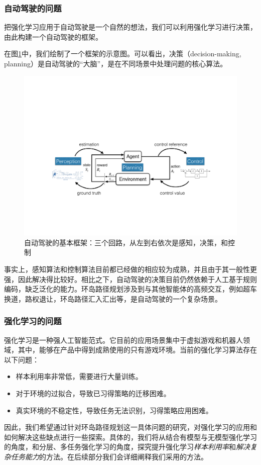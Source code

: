 \documentclass[degree=bachelor, tocarialchapter, pifootnote]{thuthesis}
\begin{document}
    \subsubsection{自动驾驶的问题}
      把强化学习应用于自动驾驶是一个自然的想法，我们可以利用强化学习进行决策，由此构建一个自动驾驶的框架\cite{DRL_for_driving}。\par
      在图\ref{fig:self-driving_overview}中，我们绘制了一个框架的示意图。可以看出，决策（decision-making, planning）是自动驾驶的``大脑''，是在不同场景中处理问题的核心算法。\par
      \begin{figure}[H] %
        \centering
        \includegraphics[scale=0.5]{driving_overview}
        \caption{自动驾驶的基本框架：三个回路，从左到右依次是感知，决策，和控制}
        \label{fig:self-driving_overview}
      \end{figure}
      事实上，感知算法和控制算法目前都已经做的相应较为成熟，并且由于其一般性更强，因此解决得比较好。相比之下，自动驾驶的决策目前仍然依赖于人工基于规则编码，缺乏泛化的能力。环岛路径规划涉及到与其他智能体的高频交互，例如超车换道，路权退让，环岛路径汇入汇出等，是自动驾驶的一个复杂场景。
      
    \subsubsection{强化学习的问题}
      强化学习是一种强人工智能范式。它目前的应用场景集中于虚拟游戏和机器人领域，其中，能够在产品中得到成熟使用的只有游戏环境。当前的强化学习算法存在以下问题：
      \begin{itemize}
        \item 样本利用率非常低，需要进行大量训练。
        \item 对于环境的过拟合，导致已习得策略的迁移困难。
        \item 真实环境的不稳定性，导致任务无法识别，习得策略应用困难。
      \end{itemize}
      \par 因此，我们希望通过针对环岛路径规划这一具体问题的研究，对强化学习的应用和如何解决这些缺点进行一些探索。具体的，我们将从结合有模型与无模型强化学习的角度，和分层、多任务强化学习的角度，探究提升强化学习\textit{样本利用率}和\textit{解决复杂任务能力}的方法。在后续部分我们会详细阐释我们采用的方法。
  
\end{document}
